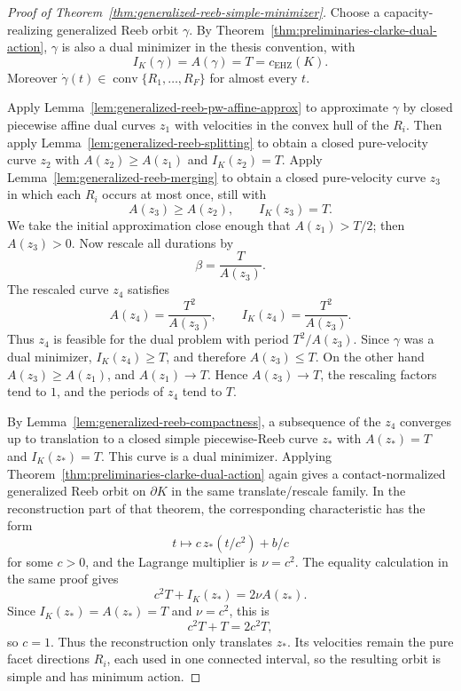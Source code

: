 \begin{proof}[Proof of Theorem~\ref{thm:generalized-reeb-simple-minimizer}]
Choose a capacity-realizing generalized Reeb orbit \(\gamma\). By
Theorem~\ref{thm:preliminaries-clarke-dual-action}, \(\gamma\) is also a dual
minimizer in the thesis convention, with
\[
  I_K(\gamma)=A(\gamma)=T=c_{\mathrm{EHZ}}(K).
\]
Moreover \(\dot\gamma(t)\in\operatorname{conv}\{R_1,\ldots,R_F\}\) for almost
every \(t\).

Apply Lemma~\ref{lem:generalized-reeb-pw-affine-approx} to approximate
\(\gamma\) by closed piecewise affine dual curves \(z_1\) with velocities in
the convex hull of the \(R_i\). Then apply
Lemma~\ref{lem:generalized-reeb-splitting} to obtain a closed pure-velocity
curve \(z_2\) with \(A(z_2)\geq A(z_1)\) and \(I_K(z_2)=T\). Apply
Lemma~\ref{lem:generalized-reeb-merging} to obtain a closed pure-velocity curve
\(z_3\) in which each \(R_i\) occurs at most once, still with
\[
  A(z_3)\geq A(z_2),
  \qquad
  I_K(z_3)=T.
\]
We take the initial approximation close enough that \(A(z_1)>T/2\); then
\(A(z_3)>0\). Now rescale all durations by
\[
  \beta=\frac{T}{A(z_3)}.
\]
The rescaled curve \(z_4\) satisfies
\[
  A(z_4)=\frac{T^2}{A(z_3)},
  \qquad
  I_K(z_4)=\frac{T^2}{A(z_3)}.
\]
Thus \(z_4\) is feasible for the dual problem with period \(T^2/A(z_3)\).
Since \(\gamma\) was a dual minimizer, \(I_K(z_4)\geq T\), and therefore
\(A(z_3)\leq T\). On the other hand \(A(z_3)\geq A(z_1)\), and
\(A(z_1)\to T\). Hence \(A(z_3)\to T\), the rescaling factors tend to \(1\),
and the periods of \(z_4\) tend to \(T\).

By Lemma~\ref{lem:generalized-reeb-compactness}, a subsequence of the \(z_4\)
converges up to translation to a closed simple piecewise-Reeb curve \(z_*\)
with \(A(z_*)=T\) and \(I_K(z_*)=T\). This curve is a dual minimizer. Applying
Theorem~\ref{thm:preliminaries-clarke-dual-action} again gives a
contact-normalized generalized Reeb orbit on \(\partial K\) in the same
translate/rescale family. In the reconstruction part of that theorem, the
corresponding characteristic has the form
\[
  t\longmapsto c\,z_*(t/c^2)+b/c
\]
for some \(c>0\), and the Lagrange multiplier is \(\nu=c^2\). The equality
calculation in the same proof gives
\[
  c^2T+I_K(z_*)=2\nu A(z_*).
\]
Since \(I_K(z_*)=A(z_*)=T\) and \(\nu=c^2\), this is
\[
  c^2T+T=2c^2T,
\]
so \(c=1\). Thus the reconstruction only translates \(z_*\). Its velocities
remain the pure facet directions \(R_i\), each used in one connected interval,
so the resulting orbit is simple and has minimum action.
\end{proof}

